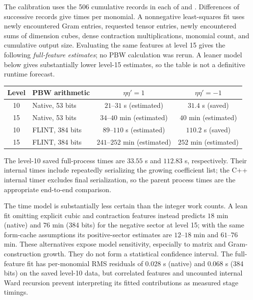 The calibration uses the 506 cumulative records in each of
 and
.
Differences of successive records give times per monomial.  A nonnegative
least-squares fit uses newly encountered Gram entries, requested tensor
entries, newly encountered sums of dimension cubes, dense contraction
multiplications, monomial count, and cumulative output size.  Evaluating the
same features at level 15 gives the following \emph{full-feature estimates};
no PBW calculation was rerun. A leaner model below gives substantially lower
level-15 estimates, so the table is not a definitive runtime forecast.
\begin{center}
\begin{tabular}{clcc}
\toprule
Level & PBW arithmetic & $\eta\eta'=1$ & $\eta\eta'=-1$\\
\midrule
10 & Native, 53 bits & $21$--$31$ s (estimated) & $31.4$ s (saved)\\
15 & Native, 53 bits & $34$--$40$ min (estimated) & $40$ min (estimated)\\
10 & FLINT, 384 bits & $89$--$110$ s (estimated) & $110.2$ s (saved)\\
15 & FLINT, 384 bits & $241$--$252$ min (estimated) & $252$ min (estimated)\\
\bottomrule
\end{tabular}
\end{center}
The level-10 saved full-process times are $33.55$ s and $112.83$ s,
respectively.  Their internal times include repeatedly serializing the growing
coefficient list; the C++ internal timer excludes final serialization, so the
parent process times are the appropriate end-to-end comparison.

The time model is substantially less certain than the integer work counts.
A lean fit omitting explicit cubic and contraction features instead predicts
$18$ min (native) and $76$ min (384 bits) for the negative sector at level 15;
with the same form-cache assumptions its positive-sector estimates are
$12$--$18$ min and $61$--$76$ min.  These alternatives expose model sensitivity,
especially to matrix and Gram-construction growth.  They do not form a
statistical confidence interval.  The full-feature fit has per-monomial RMS
residuals of $0.028$ s (native) and $0.068$ s (384 bits) on the saved level-10
data, but correlated features and uncounted internal Ward recursion prevent
interpreting its fitted contributions as measured stage timings.

